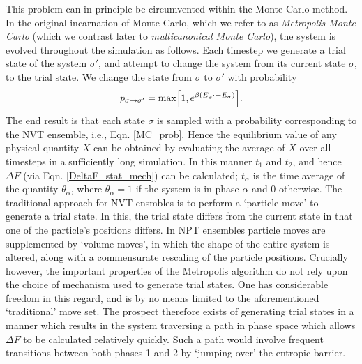 \documentclass{report}
\begin{document}
This problem can in principle be circumvented within the Monte Carlo method.
In the original incarnation of Monte Carlo, which we refer to as \emph{Metropolis Monte Carlo}\cite{Metropolis_1953} (which we contrast later to 
\emph{multicanonical Monte Carlo}), the system is evolved throughout the simulation as follows. Each timestep we generate a trial state of the system 
$\sigma'$, and attempt to change the system from its current state $\sigma$, to the trial state. We change the state from $\sigma$ to $\sigma'$ with 
probability
\begin{equation}\label{p_Metropolis}
p_{\sigma\to\sigma'}=\text{max}\Bigl[1,e^{\beta(E_{\sigma'}-E_{\sigma})}\Bigr].
\end{equation}
The end result is that each state $\sigma$ is sampled with a probability corresponding to the NVT ensemble, i.e., Eqn. \eqref{MC_prob}.
Hence the equilibrium value of any physical quantity $X$ can be obtained by evaluating the average of $X$ over all timesteps in a sufficiently long 
simulation. In this manner $t_1$ and $t_2$, and hence $\Delta F$ (via Eqn. \eqref{DeltaF_stat_mech}) can be calculated; 
$t_{\alpha}$ is the time average of the quantity $\theta_{\alpha}$, where $\theta_{\alpha}=1$ if the system is in phase $\alpha$ and 0 otherwise.
The traditional approach for NVT ensmbles is to perform a `particle move' to generate a trial state. In this, the trial state differs from the
current state in that one of the particle's positions differs. In NPT ensembles particle moves are supplemented by `volume moves', in which the 
shape of the entire system is altered, along with a commensurate rescaling of the particle positions.
Crucially however, the important properties of the Metropolis algorithm do not rely upon the choice of mechanism used to generate trial states. 
One has considerable freedom in this regard, and is by no means limited to the aforementioned `traditional' move set. The prospect therefore exists 
of generating trial states in a manner which results in the system traversing a path in phase space which allows $\Delta F$ to be calculated 
relatively quickly. Such a path would involve frequent transitions between both phases 1 and 2 by `jumping over' the entropic barrier. 
\end{document}
